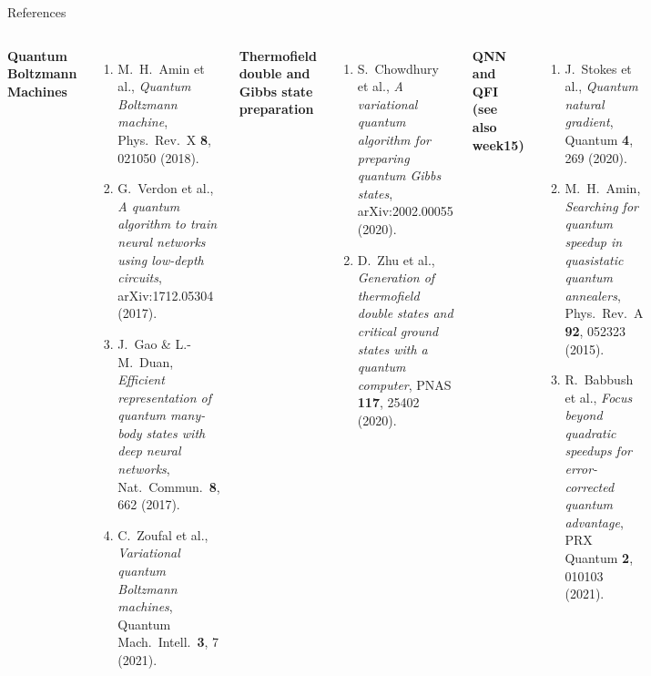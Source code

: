 \documentclass[aspectratio=169,10pt]{beamer}
\begin{document}
\begin{frame}{References}
  \begin{columns}[T]
      \textbf{Quantum Boltzmann Machines}
      \begin{enumerate}\small\itemsep1pt
        \item M.~H.~Amin et al., \emph{Quantum Boltzmann machine},
              Phys.\ Rev.\ X \textbf{8}, 021050 (2018).
        \item G.~Verdon et al., \emph{A quantum algorithm to train
              neural networks using low-depth circuits},
              arXiv:1712.05304 (2017).
        \item J.~Gao \& L.-M.\ Duan, \emph{Efficient representation
              of quantum many-body states with deep neural networks},
              Nat.\ Commun.\ \textbf{8}, 662 (2017).
        \item C.~Zoufal et al., \emph{Variational quantum Boltzmann
              machines}, Quantum Mach.\ Intell.\ \textbf{3}, 7 (2021).
      \end{enumerate}
      \textbf{Thermofield double and Gibbs state preparation}
      \begin{enumerate}\small\itemsep1pt\setcounter{enumi}{4}
        \item S.~Chowdhury et al., \emph{A variational quantum algorithm
              for preparing quantum Gibbs states},
              arXiv:2002.00055 (2020).
        \item D.~Zhu et al., \emph{Generation of thermofield double
              states and critical ground states with a quantum computer},
              PNAS \textbf{117}, 25402 (2020).
      \end{enumerate}
      \textbf{QNN and QFI (see also week15)}
      \begin{enumerate}\small\itemsep1pt\setcounter{enumi}{6}
        \item J.~Stokes et al., \emph{Quantum natural gradient},
              Quantum \textbf{4}, 269 (2020).
        \item M.~H.~Amin, \emph{Searching for quantum speedup in
              quasistatic quantum annealers},
              Phys.\ Rev.\ A \textbf{92}, 052323 (2015).
        \item R.~Babbush et al., \emph{Focus beyond quadratic
              speedups for error-corrected quantum advantage},
              PRX Quantum \textbf{2}, 010103 (2021).
      \end{enumerate}
  \end{columns}
\end{frame}
\end{document}
